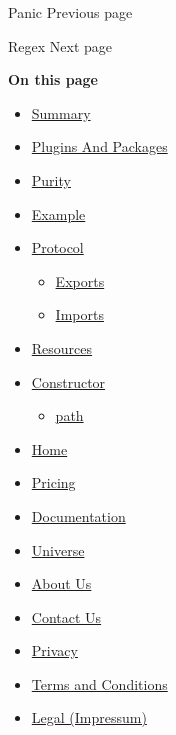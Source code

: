 { Panic } { Previous page }

\href{/docs/reference/foundations/regex/}{\pandocbounded{}}

{ Regex } { Next page }

\textbf{On this page}

\begin{itemize}
\tightlist
\item
  \hyperref[summary]{Summary}
\item
  \hyperref[plugins-and-packages]{Plugins And Packages}
\item
  \hyperref[purity]{Purity}
\item
  \hyperref[example]{Example}
\item
  \hyperref[protocol]{Protocol}

  \begin{itemize}
  \tightlist
  \item
    \hyperref[exports]{Exports}
  \item
    \hyperref[imports]{Imports}
  \end{itemize}
\item
  \hyperref[resources]{Resources}
\item
  \hyperref[constructor]{Constructor}

  \begin{itemize}
  \tightlist
  \item
    \hyperref[constructor-path]{path}
  \end{itemize}
\end{itemize}

\begin{itemize}
\tightlist
\item
  \href{/}{Home}
\item
  \href{/pricing/}{Pricing}
\item
  \href{/docs/}{Documentation}
\item
  \href{/universe/}{Universe}
\item
  \href{/about/}{About Us}
\item
  \href{/contact/}{Contact Us}
\item
  \href{/privacy/}{Privacy}
\item
  \href{https://typst.app/terms}{Terms and Conditions}
\item
  \href{/legal/}{Legal (Impressum)}
\end{itemize}

